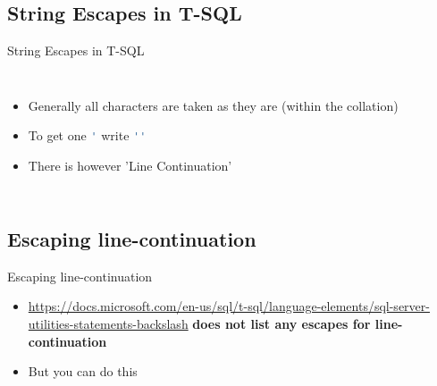 \documentclass[english,aspectratio=169]{beamer}
\begin{document}
\subsection{String Escapes in T-SQL}
\begin{frame}{String Escapes in T-SQL}
\begin{columns}
        \begin{itemize}
            \item Generally all characters are taken as they are (within the collation)
            \item To get one \lstinline[language=SQL]{'} write \lstinline[language=SQL]{''}
            \item There is however 'Line Continuation' \only<1>{}
        \end{itemize}
        \begin{center}
        \end{center}
    \end{columns}
\end{frame}

\subsection{Escaping line-continuation}
\begin{frame}{Escaping line-continuation}
\begin{itemize}
    \item \url{https://docs.microsoft.com/en-us/sql/t-sql/language-elements/sql-server-utilities-statements-backslash} \textbf{does not list any escapes for line-continuation}
    \item But you can do this 
\end{itemize}
\end{frame}
\end{document}
